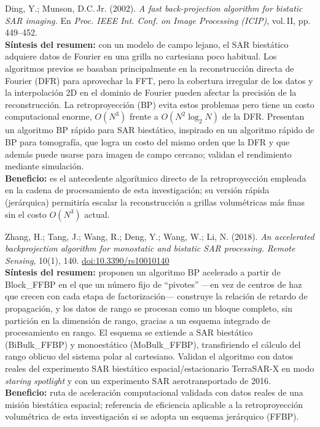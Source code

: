 \documentclass[11pt,a4paper]{report}
\begin{document}
\begin{enumerate}[label=\textbf{[B\arabic*]}, leftmargin=2.2cm, itemsep=10pt]
\item Ding, Y.; Munson, D.C.\,Jr. (2002). \textit{A fast back-projection
algorithm for bistatic SAR imaging.} En \emph{Proc. IEEE Int. Conf. on Image
Processing (ICIP)}, vol.\,II, pp.\,449--452. \cite{ding2002}\\
\textbf{Síntesis del resumen:} con un modelo de campo lejano, el SAR
biestático adquiere datos de Fourier en una grilla no cartesiana poco
habitual. Los algoritmos previos se basaban principalmente en la
reconstrucción directa de Fourier (DFR) para aprovechar la FFT, pero la
cobertura irregular de los datos y la interpolación 2D en el dominio de
Fourier pueden afectar la precisión de la reconstrucción. La
retroproyección (BP) evita estos problemas pero tiene un costo
computacional enorme, $O(N^3)$ frente a $O(N^2\log_2 N)$ de la DFR.
Presentan un algoritmo BP rápido para SAR biestático, inspirado en un
algoritmo rápido de BP para tomografía, que logra un costo del mismo orden
que la DFR y que además puede usarse para imagen de campo cercano; validan
el rendimiento mediante simulación.\\
\textbf{Beneficio:} es el antecedente algorítmico directo de la
retroproyección empleada en la cadena de procesamiento de esta
investigación; su versión rápida (jerárquica) permitiría escalar la
reconstrucción a grillas volumétricas más finas sin el costo $O(N^3)$
actual.

\item Zhang, H.; Tang, J.; Wang, R.; Deng, Y.; Wang, W.; Li, N. (2018).
\textit{An accelerated backprojection algorithm for monostatic and bistatic
SAR processing.} \emph{Remote Sensing}, 10(1), 140.
\href{https://doi.org/10.3390/rs10010140}{doi:10.3390/rs10010140}
\cite{zhang2018}\\
\textbf{Síntesis del resumen:} proponen un algoritmo BP acelerado a partir
de Block\_FFBP en el que un número fijo de ``pivotes'' ---en vez de centros
de haz que crecen con cada etapa de factorización--- construye la relación
de retardo de propagación, y los datos de rango se procesan como un bloque
completo, sin partición en la dimensión de rango, gracias a un esquema
integrado de procesamiento en rango. El esquema se extiende a SAR
biestático (BiBulk\_FFBP) y monoestático (MoBulk\_FFBP), transfiriendo el
cálculo del rango oblicuo del sistema polar al cartesiano. Validan el
algoritmo con datos reales del experimento SAR biestático
espacial/estacionario TerraSAR-X en modo \emph{staring spotlight} y con un
experimento SAR aerotransportado de 2016.\\
\textbf{Beneficio:} ruta de aceleración computacional validada con datos
reales de una misión biestática espacial; referencia de eficiencia
aplicable a la retroproyección volumétrica de esta investigación si se
adopta un esquema jerárquico (FFBP).


\end{enumerate}
\end{document}
